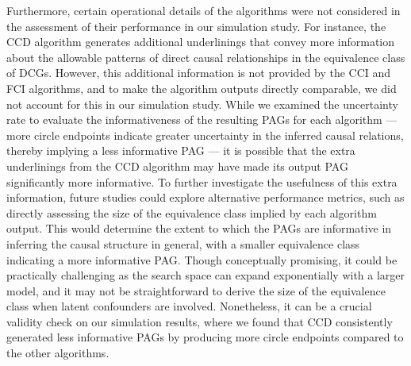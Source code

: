 \documentclass[twoside, 11pt]{article}
\begin{document}
Furthermore, certain operational details of the algorithms were not considered in the assessment of their performance in our simulation study.
For instance, the CCD algorithm generates additional underlinings that convey more information about the allowable patterns of direct causal relationships in the equivalence class of DCGs. However, this additional information is not provided by the CCI and FCI algorithms, and to make the algorithm outputs directly comparable, we did not account for this in our simulation study. 
While we examined the uncertainty rate to evaluate the informativeness of the resulting PAGs for each algorithm --- more circle endpoints indicate greater uncertainty in the inferred causal relations, thereby implying a less informative PAG --- it is possible that the extra underlinings from the CCD algorithm may have made its output PAG significantly more informative. To further investigate the usefulness of this extra information, future studies could explore alternative performance metrics, such as directly assessing the size of the equivalence class implied by each algorithm output. 
This would determine the extent to which the PAGs are informative in inferring the causal structure in general, with a smaller equivalence class indicating a more informative PAG. Though conceptually promising, it could be practically challenging as the search space can expand exponentially with a larger model, and it may not be straightforward to derive the size of the equivalence class when latent confounders are involved. Nonetheless, it can be a crucial validity check on our simulation results, where we found that CCD consistently generated less informative PAGs by producing more circle endpoints compared to the other algorithms.

\end{document}
